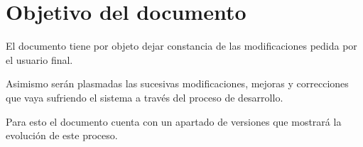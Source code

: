 \newpage

\section{Objetivo del documento}
\par El documento tiene por objeto dejar constancia de las modificaciones pedida por el usuario final. 
\par Asimismo serán plasmadas las sucesivas modificaciones, mejoras y correcciones que vaya sufriendo el sistema a través del proceso de desarrollo. \par Para esto el documento cuenta con un apartado de versiones que mostrará la evolución de este proceso.


